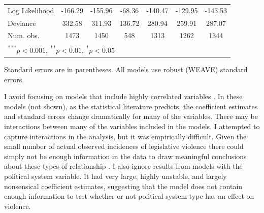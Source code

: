 \documentclass[a4paper]{article}\usepackage[]{graphicx}\usepackage[]{color}
\begin{document}
\begin{table}
\begin{center}
\begin{tabular}{l c c c c c c }
Log Likelihood          & -166.29       & -155.96       & -68.36       & -140.47       & -129.95      & -143.53      \\
Deviance                & 332.58        & 311.93        & 136.72       & 280.94        & 259.91       & 287.07       \\
Num. obs.               & 1473          & 1450          & 548          & 1313          & 1262         & 1344         \\
\hline
\multicolumn{7}{l}{\scriptsize{\textsuperscript{***}$p<0.001$, 
  \textsuperscript{**}$p<0.01$, 
  \textsuperscript{*}$p<0.05$}}
\end{tabular}


\end{center}
{\scriptsize{
    Standard errors are in parentheses. All models use robust (WEAVE) standard errors. \\
}}
\end{table}

I avoid focusing on models that include highly correlated variables \citep[see][]{Achen2002, Schrodt2006}. In these models (not shown), as the statistical literature predicts, the coefficient estimates and standard errors change dramatically for many of the variables. There may be interactions between many of the variables included in the models. I attempted to capture interactions in the analysis, but it was empirically difficult. Given the small number of actual observed incidences of legislative violence there could simply not be enough information in the data to draw meaningful conclusions about these types of relationship \citep[see][]{Brambor2006}. I also ignore results from models with the political system variable. It had very large, highly unstable, and largely nonsensical coefficient estimates, suggesting that the model does not contain enough information to test \citep{Babyak2004} whether or not political system type has an effect on violence.
\end{document}
